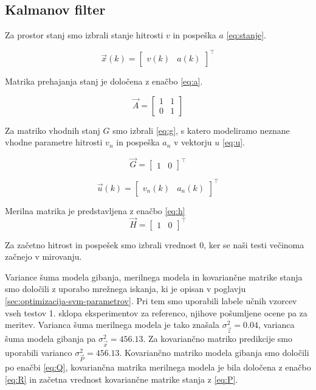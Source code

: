 \subsection{Kalmanov filter}\label{sec:implementacija-kalman}
Za prostor stanj smo izbrali stanje hitrosti $v$ in pospeška $a$ \eqref{eq:stanje}. 

\begin{equation}
\vec{x}(k) = \begin{bmatrix}
					v(k) & a(k)
				\end{bmatrix}^\top 
                \label{eq:stanje}
\end{equation}

Matrika prehajanja stanj je določena z enačbo \eqref{eq:a}.

\begin{equation}
\vec{A} = \begin{bmatrix}
				1 & 1 \\
                0 & 1
			\end{bmatrix} 
            \label{eq:a}
\end{equation}

Za matriko vhodnih stanj $G$ smo izbrali \eqref{eq:g}, s katero modeliramo neznane vhodne parametre hitrosti $v_n$ in pospeška $a_n$ v vektorju $u$ \eqref{eq:u}. 

\begin{equation}
\vec{G} = \begin{bmatrix}
				1 & 0
			\end{bmatrix}^\top 
            \label{eq:g}
\end{equation}

\begin{equation}
\vec{u}(k) = \begin{bmatrix}
					v_{n}(k) & a_n(k)
				\end{bmatrix}^\top 
                \label{eq:u}
\end{equation}


Merilna matrika je predstavljena z enačbo \eqref{eq:h}
\begin{equation}
\vec{H} = \begin{bmatrix}
				1 & 0
			\end{bmatrix}^\top 
            \label{eq:h}
\end{equation}

Za začetno hitrost in pospešek smo izbrali vrednost $0$, ker se naši testi večinoma začnejo v mirovanju. 

Variance šuma modela gibanja, merilnega modela in kovariančne matrike stanja smo določili z uporabo mrežnega iskanja, ki je opisan v poglavju \ref{sec:optimizacija-svm-parametrov}. Pri tem smo uporabili labele učnih vzorcev vseh testov 1. sklopa eksperimentov za referenco, njihove pošumljene ocene pa za meritev. Varianca šuma merilnega modela je tako znašala $\sigma_\vec{z}^2 = 0.04$, varianca šuma modela gibanja pa $\sigma_\vec{x}^2 = 456.13$. Za kovariančno matriko predikcije smo uporabili varianco $\sigma_\vec{P}^2 = 456.13$. Kovariančno matriko modela gibanja smo določili po enačbi \eqref{eq:Q}, kovariančna matrika merilnega modela je bila določena z enačbo \eqref{eq:R} in začetna vrednost kovariančne matrike stanja z \eqref{eq:P}.

